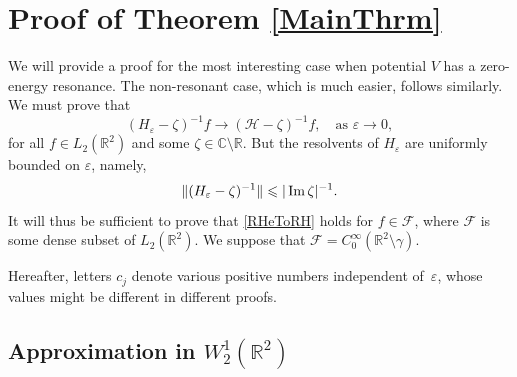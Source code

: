 \documentclass[reqno]{amsart}
\theoremstyle{plain}
\numberwithin{equation}{section}
\renewcommand{\Im}{\mathop{\rm Im}}
\newcommand{\Real}{\mathbb R}
\newcommand{\Cmpl}{\mathbb C}
\newcommand{\eps}{\varepsilon}
\newcommand{\cF}{\mathcal{F}}
\renewcommand{\leq}{\leqslant}
\begin{document}

\section{Proof of Theorem \ref{MainThrm}}
\label{Sec:Proof}

We will provide a proof for the most interesting case when potential $V$ has a zero-energy resonance. The non-resonant case, which
is much easier, follows similarly. We must prove that
\begin{equation}\label{RHeToRH}
 (H_\eps-\zeta)^{-1}f\to (\mathcal{H}-\zeta)^{-1}f,\quad \mbox{as } \eps\to 0,
\end{equation}
for all $f\in L_2(\Real^2)$ and some $\zeta\in \Cmpl\setminus\Real$.
But the resolvents of $H_\eps$ are uniformly bounded on $\eps$, namely,
\begin{equation*}
     \|(H_\eps-\zeta)^{-1}\|\leq |\Im \zeta|^{-1}.
\end{equation*}
It will thus be sufficient to prove that  \eqref{RHeToRH} holds for
$f\in \cF$, where $\cF$ is some dense subset of $L_2(\Real^2)$. We suppose that $\cF=C^\infty_0(\Real^2\setminus\gamma)$.

Hereafter, letters $c_j$ denote various posi\-ti\-ve numbers independent of~$\eps$, whose values might be different in different proofs.



\subsection{Approximation in $W_2^1(\Real^2)$}
\end{document}
